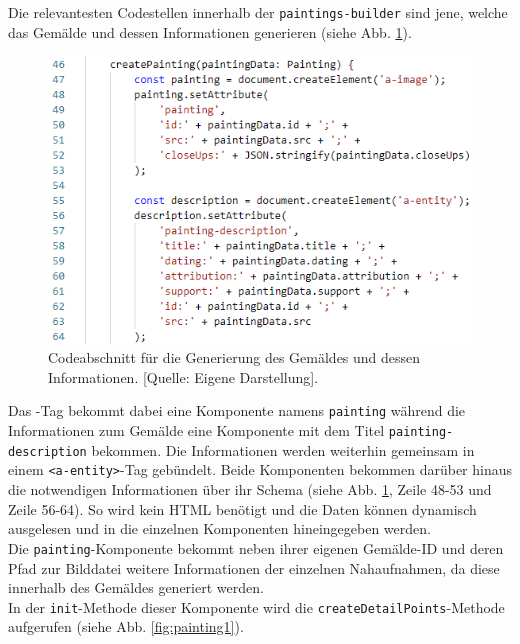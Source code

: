 \documentclass[a4paper,12pt,oneside]{article}
\begin{document}
        Die relevantesten Codestellen innerhalb der 
        \texttt{paintings-builder} sind jene, welche das Gemälde und
        dessen Informationen generieren (siehe Abb. \ref{fig:paintings-builder2}).
        \begin{figure}
          \centering
          \includegraphics{img/coding/paintings-builder2.png}
          \caption[Codeabschnitt für die Generierung des Gemäldes und dessen Informationen.]{Codeabschnitt für die Generierung des Gemäldes und dessen Informationen. [Quelle: Eigene Darstellung].}
          \label{fig:paintings-builder2}
        \end{figure}
        Das -Tag bekommt dabei eine Komponente 
        namens \texttt{painting} während die Informationen zum Gemälde
        eine Komponente mit dem Titel
        \texttt{painting-description} bekommen. Die Informationen werden
        weiterhin gemeinsam in einem \texttt{<a-entity>}-Tag gebündelt.
        Beide Komponenten bekommen darüber hinaus
        die notwendigen Informationen über ihr Schema
        (siehe Abb. \ref{fig:paintings-builder2}, Zeile 48-53 und Zeile 56-64).
        So wird kein HTML benötigt und die Daten können dynamisch ausgelesen
        und in die einzelnen Komponenten hineingegeben werden. \\
        Die \texttt{painting}-Komponente bekommt neben ihrer eigenen Gemälde-ID
        und deren Pfad zur Bilddatei weitere Informationen der einzelnen
        Nahaufnahmen, da diese innerhalb des Gemäldes generiert werden. \\
        In der \texttt{init}-Methode dieser Komponente wird die 
        \texttt{createDetailPoints}-Methode aufgerufen 
        (siehe Abb. \ref{fig:painting1}).
\end{document}
